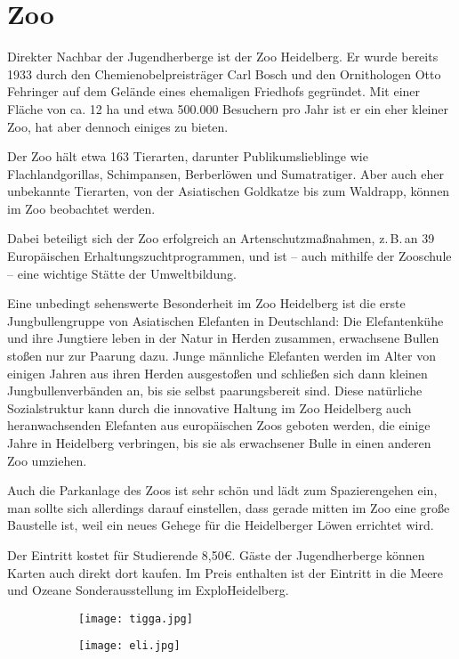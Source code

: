 
\section{Zoo}

Direkter Nachbar der Jugendherberge ist der Zoo Heidelberg. Er wurde bereits 1933 durch den Chemienobelpreisträger Carl Bosch und den Ornithologen Otto Fehringer auf dem Gelände eines ehemaligen Friedhofs gegründet. Mit einer Fläche von ca. 12 ha und etwa 500.000 Besuchern pro Jahr ist er ein eher kleiner Zoo, hat aber dennoch einiges zu bieten.

Der Zoo hält etwa 163 Tierarten, darunter Publikumslieblinge wie Flachlandgorillas, Schimpansen, Berberlöwen und Sumatratiger. Aber auch eher unbekannte Tierarten, von der Asiatischen Goldkatze bis zum Waldrapp, können im Zoo beobachtet werden.

Dabei beteiligt sich der Zoo erfolgreich an Artenschutzmaßnahmen, z.\,B.\,an 39 Europäischen Erhaltungszuchtprogrammen, und ist -- auch mithilfe der Zooschule -- eine wichtige Stätte der Umweltbildung.

Eine unbedingt sehenswerte Besonderheit im Zoo Heidelberg ist die erste Jungbullengruppe von Asiatischen Elefanten in Deutschland: Die Elefantenkühe und ihre Jungtiere leben in der Natur in Herden zusammen, erwachsene Bullen stoßen nur zur Paarung dazu. Junge männliche Elefanten werden im Alter von einigen Jahren aus ihren Herden ausgestoßen und schließen sich dann kleinen Jungbullenverbänden an, bis sie selbst paarungsbereit sind. Diese natürliche Sozialstruktur kann durch die innovative Haltung im Zoo Heidelberg auch heranwachsenden Elefanten aus europäischen Zoos geboten werden, die einige Jahre in Heidelberg verbringen, bis sie als erwachsener Bulle in einen anderen Zoo umziehen. 

Auch die Parkanlage des Zoos ist sehr schön und lädt zum Spazierengehen ein, man sollte sich allerdings darauf einstellen, dass gerade mitten im Zoo eine große Baustelle ist, weil ein neues Gehege für die Heidelberger Löwen errichtet wird.

Der Eintritt kostet für Studierende 8,50€. Gäste der Jugendherberge können Karten auch direkt dort kaufen. Im Preis enthalten ist der Eintritt in die \glqq Meere und Ozeane\grqq{}  Sonderausstellung im ExploHeidelberg.

\begin{figure}[h]
\captionsetup[subfigure]{labelformat=empty} 
\centering
\begin{subfigure}{0.5\textwidth}
\texttt{[image: tigga.jpg]} 
\end{subfigure}
\begin{subfigure}{0.3\textwidth}
\texttt{[image: eli.jpg]}
\end{subfigure}
\end{figure}